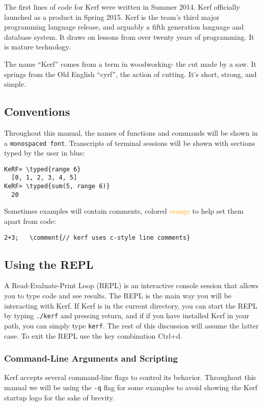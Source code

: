 \documentclass{article}
\newcommand{\typed}[1]{\textcolor{TealBlue}{#1}}
\newcommand{\comment}[1]{\textcolor{Orange}{#1}}
\begin{document}
\vspace{0.5cm}

The first lines of code for Kerf were written in Summer 2014. Kerf officially launched as a product in Spring 2015. Kerf is the team's third major programming language release, and arguably a fifth generation language and database system. It draws on lessons from over twenty years of programming. It is mature technology.

\vspace{0.5cm}

The name ``Kerf'' comes from a term in woodworking- the cut made by a saw. It springs from the Old English ``cyrf'', the action of cutting. It's short, strong, and simple.

\subsection{Conventions}
Throughout this manual, the names of functions and commands will be shown in a \texttt{monospaced font}. Transcripts of terminal sessions will be shown with sections typed by the user in \typed{blue}:
\begin{Verbatim}
KeRF> \typed{range 6}
  [0, 1, 2, 3, 4, 5]
KeRF> \typed{sum(5, range 6)}
  20
\end{Verbatim}

Sometimes examples will contain comments, colored \comment{orange} to help set them apart from code:
\begin{Verbatim}
2+3;   \comment{// kerf uses c-style line comments}
\end{Verbatim}

\pagebreak
\subsection{Using the REPL}
A Read-Evaluate-Print Loop (REPL) is an interactive console session that allows you to type code and see results. The REPL is the main way you will be interacting with Kerf. If Kerf is in the current directory, you can start the REPL by typing \texttt{./kerf} and pressing return, and if if you have installed Kerf in your path, you can simply type \texttt{kerf}. The rest of this discussion will assume the latter case. To exit the REPL use the key combination Ctrl+d.

\subsubsection{Command-Line Arguments and Scripting}
Kerf accepts several command-line flags to control its behavior. Throughout this manual we will be using the \texttt{-q} flag for some examples to avoid showing the Kerf startup logo for the sake of brevity.
\end{document}
